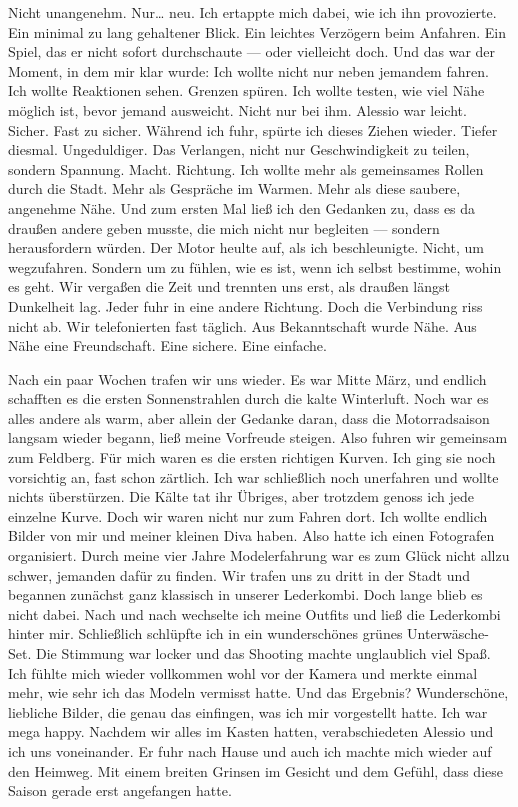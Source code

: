 Nicht unangenehm. Nur… neu.
Ich ertappte mich dabei, wie ich ihn provozierte.
Ein minimal zu lang gehaltener Blick. Ein leichtes Verzögern beim Anfahren.
Ein Spiel, das er nicht sofort durchschaute — oder vielleicht doch.
Und das war der Moment, in dem mir klar wurde:
Ich wollte nicht nur neben jemandem fahren.
Ich wollte Reaktionen sehen. Grenzen spüren.
Ich wollte testen, wie viel Nähe möglich ist, bevor jemand ausweicht.
Nicht nur bei ihm.
Alessio war leicht. Sicher.
Fast zu sicher.
Während ich fuhr, spürte ich dieses Ziehen wieder. Tiefer diesmal. Ungeduldiger.
Das Verlangen, nicht nur Geschwindigkeit zu teilen, sondern Spannung. Macht. Richtung.
Ich wollte mehr als gemeinsames Rollen durch die Stadt.
Mehr als Gespräche im Warmen.
Mehr als diese saubere, angenehme Nähe.
Und zum ersten Mal ließ ich den Gedanken zu,
dass es da draußen andere geben musste,
die mich nicht nur begleiten —
sondern herausfordern würden.
Der Motor heulte auf, als ich beschleunigte.
Nicht, um wegzufahren.
Sondern um zu fühlen,
wie es ist, wenn ich selbst bestimme, wohin es geht.
Wir vergaßen die Zeit und trennten uns erst, als draußen längst Dunkelheit lag. Jeder fuhr in eine andere Richtung.
Doch die Verbindung riss nicht ab.
Wir telefonierten fast täglich.
Aus Bekanntschaft wurde Nähe.
Aus Nähe eine Freundschaft.
Eine sichere.
Eine einfache.

Nach ein paar Wochen trafen wir uns wieder.
Es war Mitte März, und endlich schafften es die ersten Sonnenstrahlen durch die kalte Winterluft. Noch war es alles andere als warm, aber allein der Gedanke daran, dass die Motorradsaison langsam wieder begann, ließ meine Vorfreude steigen.
Also fuhren wir gemeinsam zum Feldberg.
Für mich waren es die ersten richtigen Kurven. Ich ging sie noch vorsichtig an, fast schon zärtlich. Ich war schließlich noch unerfahren und wollte nichts überstürzen. Die Kälte tat ihr Übriges, aber trotzdem genoss ich jede einzelne Kurve.
Doch wir waren nicht nur zum Fahren dort.
Ich wollte endlich Bilder von mir und meiner kleinen Diva haben. Also hatte ich einen Fotografen organisiert. Durch meine vier Jahre Modelerfahrung war es zum Glück nicht allzu schwer, jemanden dafür zu finden.
Wir trafen uns zu dritt in der Stadt und begannen zunächst ganz klassisch in unserer Lederkombi.
Doch lange blieb es nicht dabei.
Nach und nach wechselte ich meine Outfits und ließ die Lederkombi hinter mir. Schließlich schlüpfte ich in ein wunderschönes grünes Unterwäsche-Set.
Die Stimmung war locker und das Shooting machte unglaublich viel Spaß. Ich fühlte mich wieder vollkommen wohl vor der Kamera und merkte einmal mehr, wie sehr ich das Modeln vermisst hatte.
Und das Ergebnis?
Wunderschöne, liebliche Bilder, die genau das einfingen, was ich mir vorgestellt hatte.
Ich war mega happy.
Nachdem wir alles im Kasten hatten, verabschiedeten Alessio und ich uns voneinander. Er fuhr nach Hause und auch ich machte mich wieder auf den Heimweg.
Mit einem breiten Grinsen im Gesicht und dem Gefühl, dass diese Saison gerade erst angefangen hatte.

